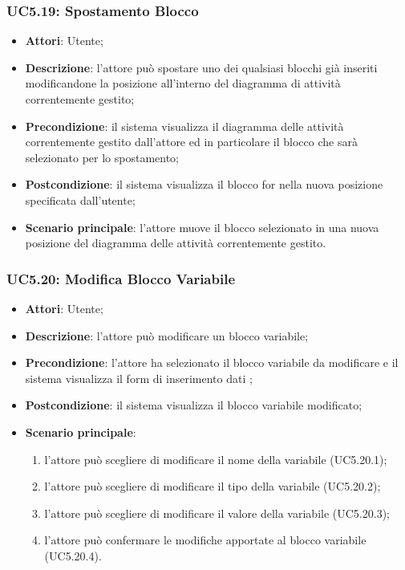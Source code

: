 \subsubsection{UC5.19: Spostamento Blocco}
\label{UC5.19}
\begin{itemize}
\item \textbf{Attori}: Utente;
\item \textbf{Descrizione}: l'attore può spostare uno dei qualsiasi blocchi già inseriti modificandone la posizione all'interno del diagramma di attività correntemente gestito;	
\item \textbf{Precondizione}: il sistema visualizza il diagramma delle attività correntemente gestito dall'attore ed in particolare il blocco che sarà selezionato per lo spostamento;	
\item \textbf{Postcondizione}: il sistema visualizza il blocco for nella nuova posizione specificata dall'utente;	
\item \textbf{Scenario principale}:
l'attore muove il blocco selezionato in una nuova posizione del diagramma delle attività correntemente gestito.	
\end{itemize}

\subsubsection{UC5.20: Modifica Blocco Variabile}
\label{UC5.20}
\begin{itemize}
\item \textbf{Attori}: Utente;
\item \textbf{Descrizione}: l'attore può modificare un blocco variabile;
\item \textbf{Precondizione}: l'attore ha selezionato il blocco variabile da modificare e il sistema visualizza il form di inserimento dati ;	
\item \textbf{Postcondizione}: il sistema visualizza il blocco variabile modificato;	
\item \textbf{Scenario principale}:
\begin{enumerate}
\item l'attore può scegliere di modificare il nome della variabile (UC5.20.1);
\item l'attore può scegliere di modificare il tipo della variabile (UC5.20.2);
\item l'attore può scegliere di modificare il valore della variabile (UC5.20.3);
\item l'attore può confermare le modifiche apportate al blocco variabile (UC5.20.4).
\end{enumerate}
\end{itemize}

